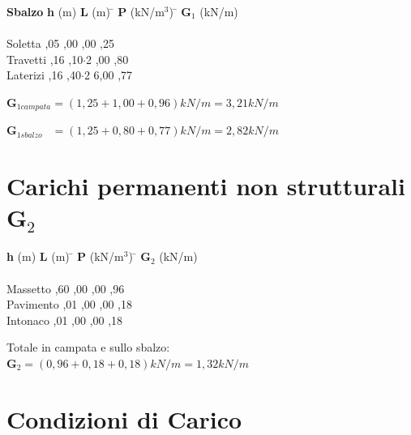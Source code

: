\documentclass[a4paper,12pt, oneside]{book}
\begin{document}
	\begin{tabbing}
		\textbf{Sbalzo}\phantom{11.} \hspace{2em} \= \textbf{h} (m)\hspace{3em} \= \textbf{L} (m)\hspace{3em} \= $\textbf{P}$ (kN/m$^3$)\hspace{3em} \= $\textbf{G}_1$ (kN/m)\hspace{1em}\\\\
		Soletta  ,05 ,00           ,00           ,25  \\
		Travetti \> 0,16 ,10$\cdot$2   ,00           ,80  \\ 
		Laterizi \> 0,16 ,40$\cdot$2 \> \phantom{0}6,00   ,77                                    
	\end{tabbing}

    \phantom{123}$\textbf{G}_{1campata}=(1,25+1,00+0,96)kN/m=3,21kN/m$ 
	
	\phantom{123}$\textbf{G}_{1sbalzo}\phantom{1.}=(1,25+0,80+0,77)kN/m=2,82kN/m$

    \section{Carichi permanenti non strutturali $\textbf{G}_2$}
    
    \begin{tabbing}
    	\hspace{2em} \= \textbf{h} (m)\hspace{3em} \= \textbf{L} (m)\hspace{3em} \= $\textbf{P}$ (kN/m$^3$)\hspace{3em} \= $\textbf{G}_2$ (kN/m)\hspace{1em}\\\\
    	Massetto  ,60 ,00 ,00           ,96  \\
    	Pavimento ,01 ,00 ,00           ,18  \\ 
    	Intonaco  ,01 ,00 ,00           ,18                                    
    \end{tabbing}    
    
    Totale in campata e sullo sbalzo:\\
    \phantom{123}$\textbf{G}_2=(0,96+0,18+0,18)kN/m=1,32kN/m$ 
    
    \section{Condizioni di Carico}
    
\end{document}
